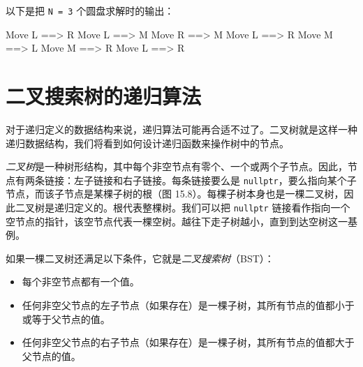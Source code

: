 以下是把 \texttt{N = 3} 个圆盘求解时的输出：

\begin{codebox}
Move L ==> R
Move L ==> M
Move R ==> M
Move L ==> R
Move M ==> L
Move M ==> R
Move L ==> R
\end{codebox}
\par
{}\par
{}\par
{}\par


\section{二叉搜索树的递归算法}

对于递归定义的数据结构来说，递归算法可能再合适不过了。二叉树就是这样一种递归数据结构，我们将看到如何设计递归函数来操作树中的节点。

\emph{二叉树}是一种树形结构，其中每个非空节点有零个、一个或两个子节点。因此，节点有两条链接：左子链接和右子链接。每条链接要么是 \texttt{nullptr}，要么指向某个子节点，而该子节点是某棵子树的根（图 15.8）。每棵子树本身也是一棵二叉树，因此二叉树是递归定义的。根代表整棵树。我们可以把 \texttt{nullptr} 链接看作指向一个空节点的指针，该空节点代表一棵空树。越往下走子树越小，直到到达空树这一基例。


如果一棵二叉树还满足以下条件，它就是\emph{二叉搜索树}（BST）：

\begin{itemize}
\item 每个非空节点都有一个值。
\item 任何非空父节点的左子节点（如果存在）是一棵子树，其所有节点的值都小于或等于父节点的值。
\item 任何非空父节点的右子节点（如果存在）是一棵子树，其所有节点的值都大于父节点的值。
\end{itemize}


